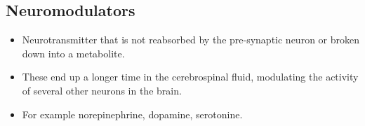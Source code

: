 \documentclass[main]{subfiles}
\begin{document}
\subsection{Neuromodulators}
\begin{itemize}[noitemsep,nolistsep]
	\item Neurotransmitter that is not reabsorbed by the pre-synaptic neuron or broken down into a metabolite.
	\item These end up a longer time in the cerebrospinal fluid, modulating the activity of several other neurons in the brain.
	\item For example norepinephrine, dopamine, serotonine.
\end{itemize}
\end{document}
